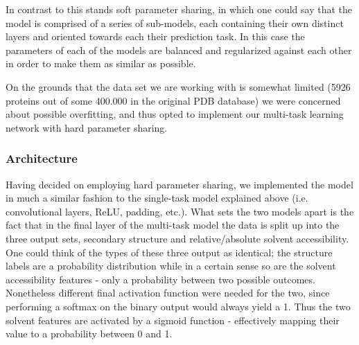 \begin{multicols}{2}
In contrast to this stands soft parameter sharing, in which one could say that the model is comprised of a series of sub-models, each containing their own distinct layers and oriented towards each their prediction task. In this case the parameters of each of the models are balanced and regularized against each other in order to make them as similar as possible.

On the grounds that the data set we are working with is somewhat limited (5926 proteins out of some 400.000 in the original PDB database) we were concerned about possible overfitting, and thus opted to implement our multi-task learning network with hard parameter sharing.

\subsubsection{Architecture}
Having decided on employing hard parameter sharing, we implemented the model in much a similar fashion to the single-task model explained above (i.e. convolutional layers, ReLU, padding, etc.). What sets the two models apart is the fact that in the final layer of the multi-task model the data is split up into the three output sets, secondary structure and relative/absolute solvent accessibility.\\
One could think of the types of these three output as identical; the structure labels are a probability distribution while in a certain sense so are the solvent accessibility features - only a probability between two possible outcomes.\\
Nonetheless different final activation function were needed for the two, since performing a softmax on the binary output would always yield a 1. Thus the two solvent features are activated by a sigmoid function - effectively mapping their value to a probability between 0 and 1.\\


\end{multicols}
